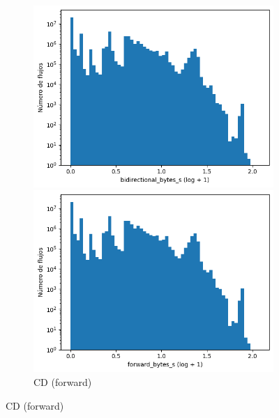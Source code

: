 \begin{figure}[H]
    \centering
    \hfill
    \begin{subfigure}[b]{0.26\textwidth}
        \centering
        \includegraphics[width=\textwidth]{media/packet_pincer_cicddos/bidirectional_bytes_s_log_x_log_y.png}
        \caption{CD (bidir.)}
        \includegraphics[width=\textwidth]{media/packet_pincer_cicddos/forward_bytes_s_log_x_log_y.png}
        \caption{CD (forward)}

\end{subfigure}
\end{figure}
